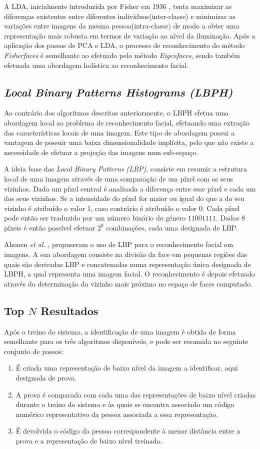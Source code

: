 A LDA, inicialmente introduzida por Fisher em 1936 \cite{FISHER1936}, tenta maximizar as diferenças existentes entre diferentes indivíduos(inter-classe) e minimizar as variações entre imagens da mesma pessoa(intra-classe) de modo a obter uma representação mais robusta em termos de variação ao nível da iluminação. Após a aplicação dos passos de PCA e LDA, o processo de reconhecimento do método \textit{Fisherfaces} é semelhante ao efetuado pelo método \textit{Eigenfaces}, sendo também efetuada uma abordagem holística ao reconhecimento facial.


\subsection{\textit{Local Binary Patterns Histograms (LBPH)}} \label{sec:lbph}
Ao contrário dos algoritmos descritos anteriormente, o LBPH efetua uma abordagem local ao problema de reconhecimento facial, efetuando uma extração das características locais de uma imagem. Este tipo de abordagem possui a vantagem de possuir uma baixa dimensionalidade implícita, pelo que não existe a necessidade de efetuar a projeção das imagens num sub-espaço.

A ideia base das \textit{Local Binary Patterns (LBP)}, consiste em resumir a estrutura local de uma imagem através de uma comparação de um píxel com os seus vizinhos. Dado um píxel central é analisada a diferença entre esse píxel e cada um dos seus vizinhos. Se a intensidade do píxel for maior ou igual do que a do seu vizinho é atribuído o valor 1, caso contrário é atribuído o valor 0. Cada píxel pode então ser traduzido por um número binário do género $11001111$. Dados $8$ píxeis é então possível efetuar $2^8$ combinações, cada uma designada de LBP.

Ahonen \textit{et al.} \cite{ahonen2004face}, propuseram o uso de LBP para o reconhecimento facial em imagens. A sua abordagem consiste na divisão da face em pequenas regiões das quais são derivadas LBP e concatenadas numa representação única designada de LBPH, a qual representa uma imagem facial. O reconhecimento é depois efetuado através do determinação do vizinho mais próximo no espaço de faces computado.

\subsection{Top $N$ Resultados} \label{sec:topn}
Após o treino do sistema, a identificação de uma imagem é obtida de forma semelhante para os três algoritmos disponíveis, e pode ser resumida no seguinte conjunto de passos:
\begin{enumerate}
\item É criada uma representação de baixo nível da imagem a identificar, aqui designada de prova.
\item A prova é comparada com cada uma das representações de baixo nível criadas durante o treino do sistema e às quais se encontra associado um código numérico representativo da pessoa associada a essa representação.
\item É devolvida o código da pessoa correspondente à menor distância entre a prova e a representação de baixo nível treinada.
\end{enumerate}

